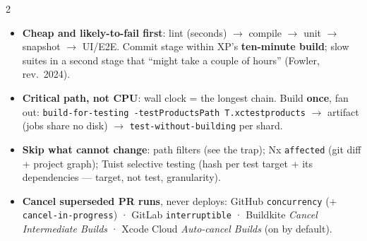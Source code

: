 \documentclass[8pt]{extarticle}
\newcommand\ct[1]{\texttt{#1}}
\newcommand\hd[1]{\par\vspace{3pt}\noindent{\bfseries\color{sheetBlue}#1}\par\vspace{1pt}}
\begin{document}
\begin{multicols}{2}
\raggedright
\footnotesize{}

\hd{Order and speed}
\begin{itemize}
  \item \textbf{Cheap and likely-to-fail first}: lint (seconds) $\rightarrow$ compile $\rightarrow$ unit $\rightarrow$
        snapshot $\rightarrow$ UI/E2E. Commit stage within XP's \textbf{ten-minute build}; slow suites in a
        second stage that ``might take a couple of hours'' (Fowler, rev.\ 2024).
  \item \textbf{Critical path, not CPU}: wall clock = the longest chain. Build \textbf{once}, fan out:
        \ct{build-for-testing -testProductsPath T.xctestproducts} $\rightarrow$ artifact (jobs share no disk)
        $\rightarrow$ \ct{test-without-building} per shard.
  \item \textbf{Skip what cannot change}: path filters (see the trap); Nx \ct{affected} (git diff + project
        graph); Tuist selective testing (hash per test target + its dependencies — target, not test, granularity).
  \item \textbf{Cancel superseded PR runs}, never deploys: GitHub \ct{concurrency} (+ \ct{cancel-in-progress})
        · GitLab \ct{interruptible} · Buildkite \emph{Cancel Intermediate Builds} · Xcode Cloud
        \emph{Auto-cancel Builds} (on by default).
\end{itemize}


\end{multicols}
\end{document}
